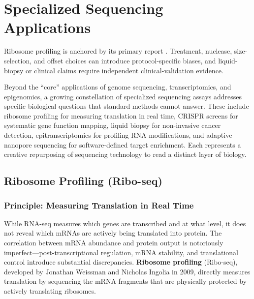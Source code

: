 \chapter{Specialized Sequencing Applications}
\label{ch:specialized}

\begin{sourcebox}
Ribosome profiling is anchored by its primary report \cite{ingolia2009}. Treatment, nuclease, size-selection, and offset choices can introduce protocol-specific biases, and liquid-biopsy or clinical claims require independent clinical-validation evidence.
\end{sourcebox}

\begin{keyconcept}
Beyond the ``core'' applications of genome sequencing, transcriptomics, and epigenomics, a growing constellation of specialized sequencing assays addresses specific biological questions that standard methods cannot answer. These include ribosome profiling for measuring translation in real time, CRISPR screens for systematic gene function mapping, liquid biopsy for non-invasive cancer detection, epitranscriptomics for profiling RNA modifications, and adaptive nanopore sequencing for software-defined target enrichment. Each represents a creative repurposing of sequencing technology to read a distinct layer of biology.
\end{keyconcept}

\section{Ribosome Profiling (Ribo-seq)}
\label{sec:specialized:riboseq}

\subsection{Principle: Measuring Translation in Real Time}
\label{subsec:specialized:riboseq-principle}

While \acrshort{RNA-seq} measures which genes are transcribed and at what level, it does not reveal which mRNAs are actively being translated into protein. The correlation between mRNA abundance and protein output is notoriously imperfect---post-transcriptional regulation, mRNA stability, and translational control introduce substantial discrepancies. \textbf{Ribosome profiling} (Ribo-seq), developed by Jonathan Weissman and Nicholas Ingolia in 2009, directly measures translation by sequencing the mRNA fragments that are physically protected by actively translating ribosomes.

